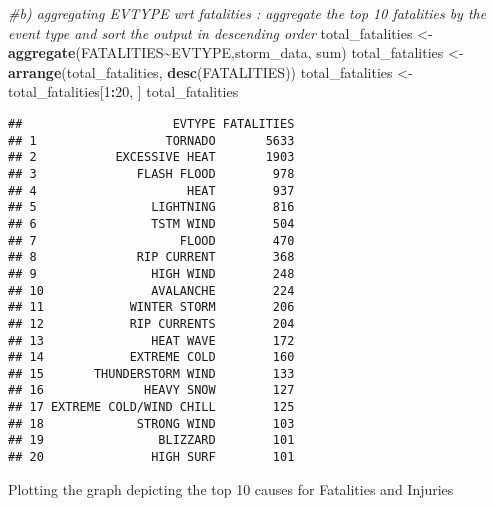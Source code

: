 \documentclass[
]{article}
\newenvironment{Shaded}{\begin{snugshade}}{\end{snugshade}}
\newcommand{\CommentTok}[1]{\textcolor[rgb]{0.56,0.35,0.01}{\textit{#1}}}
\newcommand{\DecValTok}[1]{\textcolor[rgb]{0.00,0.00,0.81}{#1}}
\newcommand{\FunctionTok}[1]{\textcolor[rgb]{0.13,0.29,0.53}{\textbf{#1}}}
\newcommand{\NormalTok}[1]{#1}
\newcommand{\OtherTok}[1]{\textcolor[rgb]{0.56,0.35,0.01}{#1}}
\newcommand{\SpecialCharTok}[1]{\textcolor[rgb]{0.81,0.36,0.00}{\textbf{#1}}}
\begin{document}
\begin{Shaded}
\begin{Highlighting}[]
\CommentTok{\#b) aggregating EVTYPE wrt fatalities : aggregate the top 10 fatalities by the event type and sort the output in descending order}
\NormalTok{total\_fatalities }\OtherTok{\textless{}{-}} \FunctionTok{aggregate}\NormalTok{(FATALITIES}\SpecialCharTok{\textasciitilde{}}\NormalTok{EVTYPE,storm\_data, sum)}
\NormalTok{total\_fatalities }\OtherTok{\textless{}{-}} \FunctionTok{arrange}\NormalTok{(total\_fatalities, }\FunctionTok{desc}\NormalTok{(FATALITIES))}
\NormalTok{total\_fatalities }\OtherTok{\textless{}{-}}\NormalTok{ total\_fatalities[}\DecValTok{1}\SpecialCharTok{:}\DecValTok{20}\NormalTok{, ]}
\NormalTok{total\_fatalities}
\end{Highlighting}
\end{Shaded}

\begin{verbatim}
##                     EVTYPE FATALITIES
## 1                  TORNADO       5633
## 2           EXCESSIVE HEAT       1903
## 3              FLASH FLOOD        978
## 4                     HEAT        937
## 5                LIGHTNING        816
## 6                TSTM WIND        504
## 7                    FLOOD        470
## 8              RIP CURRENT        368
## 9                HIGH WIND        248
## 10               AVALANCHE        224
## 11            WINTER STORM        206
## 12            RIP CURRENTS        204
## 13               HEAT WAVE        172
## 14            EXTREME COLD        160
## 15       THUNDERSTORM WIND        133
## 16              HEAVY SNOW        127
## 17 EXTREME COLD/WIND CHILL        125
## 18             STRONG WIND        103
## 19                BLIZZARD        101
## 20               HIGH SURF        101
\end{verbatim}

Plotting the graph depicting the top 10 causes for Fatalities and
Injuries
\end{document}
